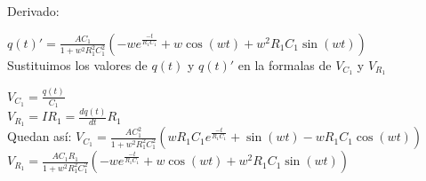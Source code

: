 \documentclass[12pt]{article}
\newcommand{\derivada}[2]{\displaystyle{\frac{d#1}{d#2}}}
\newcommand{\e}[1]{e^{#1}}
\newcommand{\escribir}[1]{\singlespacing#1\singlespacing}
\newcommand{\fraccion}[2]{\displaystyle{\frac{#1}{#2}}}
\begin{document}
	\escribir{Derivado:}

	$q(t)'=\fraccion{AC_1}{1+w^2R_1^2C_1^2}(-w\e{\frac{-t}{R_1C_1}}+w\cos(wt)+w^2R_1C_1\sin(wt))$\\

		
	\escribir{Sustituimos los valores de $q(t)$ y $q(t)'$  en la formalas de $V_{C_1}$ y $V_{R_1}$ }

	$V_{C_1}=\fraccion{q(t)}{C_1} $\\

	$V_{R_1}=IR_1=\derivada{q(t)}{t}R_1$\\

	\escribir{Quedan así:}
	$V_{C_1}=\fraccion{AC_1^2}{1+w^2R_1^2C_1^2}(wR_1C_1\e{\frac{-t}{R_1C_1}}+\sin(wt)-wR_1C_1\cos(wt))$\\


	$V_{R_1}=\fraccion{AC_1R_1}{1+w^2R_1^2C_1^2}(-w\e{\frac{-t}{R_1C_1}}+w\cos(wt)+w^2R_1C_1\sin(wt))$\\

\end{document}
